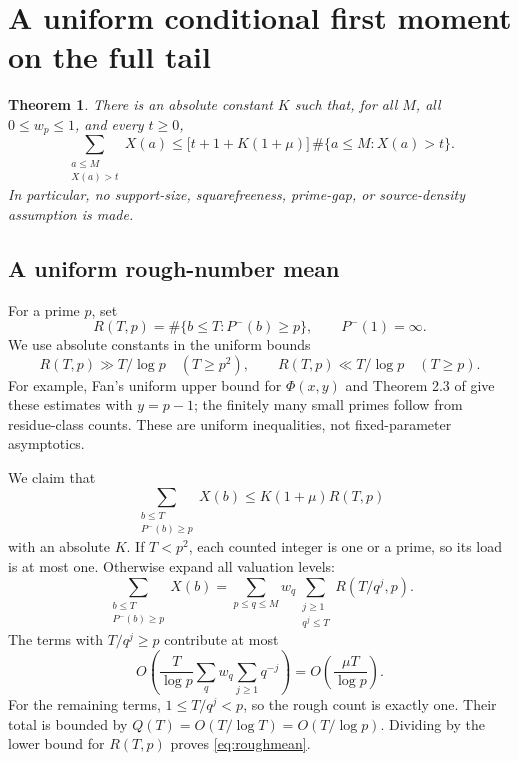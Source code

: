 \documentclass[11pt,a4paper]{article}
\newtheorem{theorem}{Theorem}
\begin{document}
\section{A uniform conditional first moment on the full tail}

\begin{theorem}\label{thm:tail}
There is an absolute constant $K$ such that, for all $M$, all
$0\le w_p\le1$, and every $t\ge0$,
\begin{equation}
 \sum_{\substack{a\le M\\X(a)>t}}X(a)
 \le\bigl[t+1+K(1+\mu)\bigr]\,
       \#\{a\le M:X(a)>t\}.                            \label{eq:tailmean}
\end{equation}
In particular, no support-size, squarefreeness, prime-gap, or
source-density assumption is made.
\end{theorem}

\subsection*{A uniform rough-number mean}
For a prime $p$, set
\[
 R(T,p)=\#\{b\le T:P^-(b)\ge p\},\qquad P^-(1)=\infty.
\]
We use absolute constants in the uniform bounds
\[
 R(T,p)\gg T/\log p\quad(T\ge p^2),\qquad
 R(T,p)\ll T/\log p\quad(T\ge p).
\]
For example, Fan's uniform upper bound for $\Phi(x,y)$ and
Theorem 2.3 of \cite{Fan} give these estimates with $y=p-1$;
the finitely many small primes follow from residue-class counts.
These are uniform inequalities, not fixed-parameter asymptotics.

We claim that
\begin{equation}
 \sum_{\substack{b\le T\\P^-(b)\ge p}}X(b)
 \le K(1+\mu)R(T,p)                                  \label{eq:roughmean}
\end{equation}
with an absolute $K$. If $T<p^2$, each counted integer is one or a
prime, so its load is at most one. Otherwise expand all valuation levels:
\[
 \sum_{\substack{b\le T\\P^-(b)\ge p}}X(b)
 =\sum_{p\le q\le M}w_q\sum_{\substack{j\ge1\\q^j\le T}}
                         R(T/q^j,p).
\]
The terms with $T/q^j\ge p$ contribute at most
\[
 O\!\left(\frac T{\log p}\sum_qw_q\sum_{j\ge1}q^{-j}\right)
 =O\!\left(\frac{\mu T}{\log p}\right).
\]
For the remaining terms, $1\le T/q^j<p$, so the rough count is
exactly one. Their total is bounded by
$Q(T)=O(T/\log T)=O(T/\log p)$. Dividing by the lower bound for
$R(T,p)$ proves \eqref{eq:roughmean}.
\end{document}
